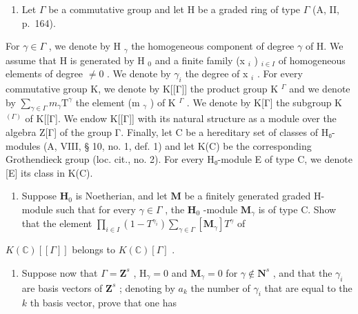 
\begin{enumerate}
\def\labelenumi{\arabic{enumi})}
\tightlist
\item
  Let \(\Gamma\) be a commutative group and let H be a graded ring of type \(\Gamma\) (A, II, p.~164).
\end{enumerate}

For \(\gamma\in\Gamma\) , we denote by H \(_{\gamma}\) the homogeneous component of degree \(\gamma\) of H. We assume that H is generated by H \(_{0}\) and a finite family (x \(_{i}\) ) \(_{i\in I}\) of homogeneous elements of degree \(\neq0\) . We denote by \(\gamma_{i}\) the degree of x \(_{i}\) . For every commutative group K, we denote by K{[}{[}Γ{]}{]} the product group K \(^{\Gamma}\) and we denote by \(\sum_{\gamma\in\Gamma}m_{\gamma}\text{T}^{\gamma}\) the element (m \(_{\gamma}\) ) of K \(^{\Gamma}\) . We denote by K{[}Γ{]} the subgroup K \(^{(\Gamma)}\) of K{[}{[}Γ{]}. We endow K{[}{[}Γ{]}{]} with its natural structure as a module over the algebra Z{[}Γ{]} of the group Γ. Finally, let C be a hereditary set of classes of H₀-modules (A, VIII, § 10, no. 1, def. 1) and let K(C) be the corresponding Grothendieck group (loc. cit., no. 2). For every H₀-module E of type C, we denote {[}E{]} its class in K(C).

\begin{enumerate}
\def\labelenumi{\alph{enumi})}
\tightlist
\item
  Suppose \(\mathbf{H}_0\) is Noetherian, and let \(\mathbf{M}\) be a finitely generated graded H-module such that for every \(\gamma \in \Gamma\) , the \(\mathbf{H}_0\) -module \(\mathbf{M}_{\gamma}\) is of type C. Show that the element \(\prod_{i \in I} (1 - T^{\gamma_i}) \sum_{\gamma \in \Gamma} [\mathbf{M}_{\gamma}] T^{\gamma}\) of
\end{enumerate}

\(K(\mathbb{C})[[\Gamma]]\) belongs to \(K(\mathbb{C})[\Gamma]\) .

\begin{enumerate}
\def\labelenumi{\alph{enumi})}
\setcounter{enumi}{1}
\tightlist
\item
  Suppose now that \(\Gamma = \mathbf{Z}^s\) , \(\mathrm{H}_{\gamma} = 0\) and \(\mathbf{M}_{\gamma} = 0\) for \(\gamma \notin \mathbf{N}^s\) , and that the \(\gamma_i\) are basis vectors of \(\mathbf{Z}^s\) ; denoting by \(a_k\) the number of \(\gamma_i\) that are equal to the \(k\) th basis vector, prove that one has
\end{enumerate}

